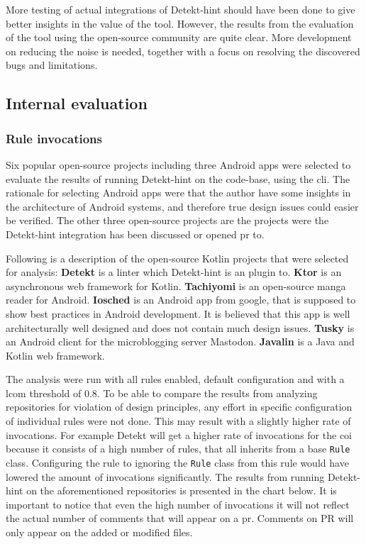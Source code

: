 \documentclass[pdftex,10pt,b5paper,twoside]{report}
\begin{document}
More testing of actual integrations of Detekt-hint should have been done to give better insights in the value of the tool. However, the results from the evaluation of the tool using the open-source community are quite clear. More development on reducing the noise is needed, together with a focus on resolving the discovered bugs and limitations.
 
\subsection{Internal evaluation}
\label{evaluation-internal}
\subsubsection{Rule invocations}
Six popular open-source projects including three Android apps were selected to evaluate the results of running Detekt-hint on the code-base, using the \gls{cli}. The rationale for selecting Android apps were that the author have some insights in the architecture of Android systems, and therefore true design issues could easier be verified. The other three open-source projects are the projects were the Detekt-hint integration has been discussed or opened \gls{pr} to. 


Following is a description of the open-source Kotlin projects that were selected for analysis: \textbf{Detekt} is a linter which Detekt-hint is an plugin to. \textbf{Ktor} is an asynchronous web framework for Kotlin. \textbf{Tachiyomi} is an open-source manga reader for Android. \textbf{Iosched} is an Android app from google, that is supposed to show best practices in Android development. It is believed that this app is well architecturally well designed and does not contain much design issues. \textbf{Tusky} is an Android client for the microblogging server Mastodon. \textbf{Javalin} is a Java and Kotlin web framework. 



The analysis were run with all rules enabled, default configuration and with a \gls{lcom} threshold of 0.8. To be able to compare the results from analyzing repositories for violation of design principles, any effort in specific configuration of individual rules were not done. This may result with a slightly higher rate of invocations. For example Detekt will get a higher rate of invocations for the \gls{coi} because it consists of a high number of rules, that all inherits from a base \texttt{Rule} class. Configuring the rule to ignoring the \texttt{Rule} class from this rule would have lowered the amount of invocations significantly. The results from running Detekt-hint on the aforementioned repositories is presented in the chart below. It is important to notice that even the high number of invocations it will not reflect the actual number of comments that will appear on a \gls{pr}. Comments on PR will only appear on the added or modified files.
\end{document}
